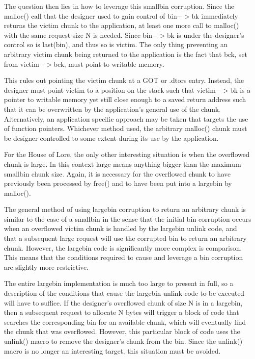 \documentclass[12pt]{article}
\begin{document}
The question then lies in how to leverage this smallbin corruption.
Since the malloc() call that the designer used to gain control of
bin$->$bk immediately returns the victim chunk to the application, at
least one more call to malloc() with the same request size N is
needed. Since bin$->$bk is under the designer's control so is
last(bin), and thus so is victim. The only thing preventing an
arbitrary victim chunk being returned to the application is the
fact that bck, set from victim$->$bck, must point to writable memory.
\newline


This rules out pointing the victim chunk at a GOT or .dtors entry.
Instead, the designer must point victim to a position on the stack
such that victim$->$bk is a pointer to writable memory yet still
close enough to a saved return address such that it can be
overwritten by the application's general use of the chunk.
Alternatively, an application specific approach may be taken that
targets the use of function pointers. Whichever method used, the
arbitrary malloc() chunk must be designer controlled to some extent
during its use by the application.
\newline


For the House of Lore, the only other interesting situation is when
the overflowed chunk is large. In this context large means anything
bigger than the maximum smallbin chunk size. Again, it is necessary
for the overflowed chunk to have previously been processed by
free() and to have been put into a largebin by malloc().
\newline


The general method of using largebin corruption to return an
arbitrary chunk is similar to the case of a smallbin in the sense
that the initial bin corruption occurs when an overflowed victim
chunk is handled by the largebin unlink code, and that a subsequent
large request will use the corrupted bin to return an arbitrary
chunk. However, the largebin code is significantly more complex is
comparison. This means that the conditions required to cause and
leverage a bin corruption are slightly more restrictive.
\newline


The entire largebin implementation is much too large to present in
full, so a description of the conditions that cause the largebin
unlink code to be executed will have to suffice. If the designer's
overflowed chunk of size N is in a largebin, then a subsequent
request to allocate N bytes will trigger a block of code that
searches the corresponding bin for an available chunk, which will
eventually find the chunk that was overflowed. However, this
particular block of code uses the unlink() macro to remove the
designer's chunk from the bin. Since the unlink() macro is no
longer an interesting target, this situation must be avoided.
\newline
\end{document}
